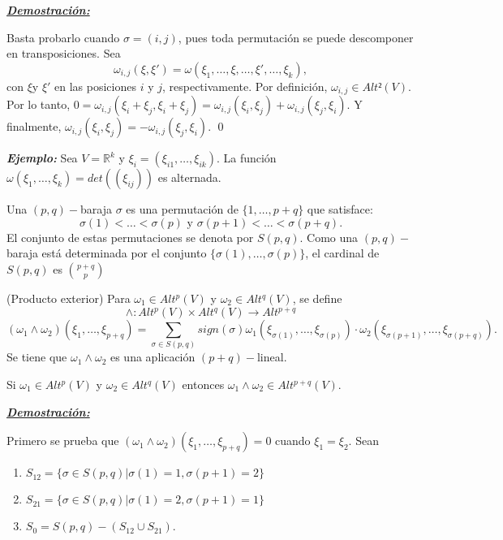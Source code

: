 \underline{\textbf{\textit{Demostración:}}}

Basta probarlo cuando $\sigma=(i,j)$, pues toda permutación se puede descomponer en transposiciones.  Sea
$$\omega_{i,j}(\xi,\xi')=\omega (\xi_1,\dots,\xi,\dots,\xi',\dots,\xi_k), $$
con $\xi $y $\xi'$ en las posiciones $i$ y $j$, respectivamente. Por definición, $\omega_{i,j}\in Alt²(V)$. Por lo tanto, $0=\omega_{i,j}(\xi_i+\xi_j,\xi_i+\xi_j)=\omega_{i,j}(\xi_i,\xi_j)+\omega_{i,j}(\xi_j,\xi_i)$. Y finalmente, $\omega_{i,j}(\xi_i,\xi_j)=-\omega_{i,j}(\xi_j,\xi_i)$. \qed

\vspace{3mm}

\textbf{\textit{Ejemplo:}} Sea $V=\mathbb{R}^k$ y $\xi_i=(\xi_{i1},\dots,\xi_{ik})$. La función $\omega(\xi_1,\dots,\xi_k)=det((\xi_{ij}))$ es alternada.

\begin{Def}
  Una $(p,q)-$baraja $\sigma$ es una permutación de $\{1,\dots,p+q \}$ que satisface:
  $$\sigma(1)<\dots <\sigma(p) \text{ y } \sigma(p+1)<\dots <\sigma(p+q). $$
  El conjunto de estas permutaciones se denota por $S(p,q)$. Como una $(p,q)-$baraja está determinada por el conjunto $\{\sigma(1),\dots,\sigma(p)\}$, el cardinal de $S(p,q)$ es ${p+q \choose p}$
\end{Def}


\begin{Def}
  (Producto exterior) Para $\omega_1 \in Alt^p(V)$ y $\omega_2\in Alt^q(V)$, se define
  $$\wedge:Alt^p(V)\times Alt^q(V)\rightarrow Alt^{p+q}$$
  $$(\omega_1 \wedge \omega_2)(\xi_1,\dots,\xi_{p+q}) = \sum_{\sigma\in S(p,q)} sign(\sigma) \omega_1(\xi_{\sigma(1)},\dots,\xi_{\sigma(p)})\cdot \omega_2(\xi_{\sigma(p+1)},\dots,\xi_{\sigma(p+q)}).$$
  Se tiene que $\omega_1\wedge \omega_2$ es una aplicación $(p+q)-$lineal.
\end{Def}

\begin{Lem}
Si $\omega_1\in Alt^p(V)$ y $\omega_2\in Alt^q(V)$ entonces $\omega_1\wedge \omega_2 \in Alt^{p+q}(V)$. 
\end{Lem}

\underline{\textbf{\textit{Demostración:}}}

Primero se prueba que $(\omega_1\wedge \omega_2)(\xi_1,\dots,\xi_{p+q})=0$ cuando $\xi_1=\xi_2$. Sean
\begin{enumerate}
\item $S_{12}=\{\sigma\in S(p,q) | \sigma(1)=1,\sigma(p+1)=2\}$
\item $S_{21}=\{\sigma \in S(p,q) | \sigma(1)=2,\sigma(p+1)=1\}$
\item $S_0=S(p,q)-(S_{12}\cup S_{21})$.
\end{enumerate}

